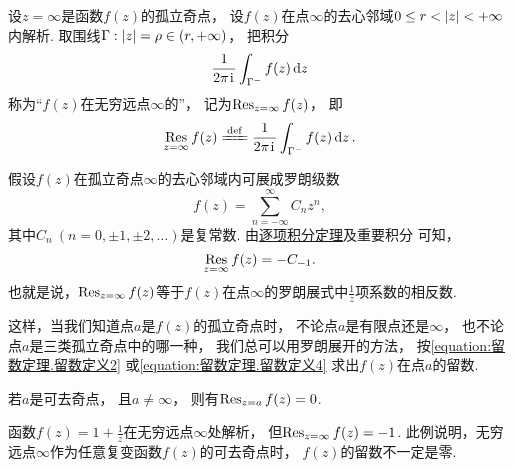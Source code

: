 \begin{definition}
设\(z=\infty\)是函数\(f(z)\)的孤立奇点，
设\(f(z)\)在点\(\infty\)的去心邻域\(0 \leq r < \abs{z} < +\infty\)内解析.
取围线\(\Gamma: \abs{z} = \rho\in(r,+\infty)\)，
把积分\[
	\frac{1}{2\pi\kern1pt\mathrm{i}\kern1pt} \int_{\Gamma^-} f(z) \dd{z}
\]称为“\(f(z)\)在无穷远点\(\infty\)的”，
记为\(\operatorname*{Res}_{z=\infty} f(z)\)，
即\begin{equation}\label{equation:留数定理.留数定义3}
	\Res_{z=\infty} f(z)
	\defeq
	\frac{1}{2\pi\iu} \int_{\Gamma^-} f(z) \dd{z}.
\end{equation}
\end{definition}

假设\(f(z)\)在孤立奇点\(\infty\)的去心邻域内可展成罗朗级数\[
	f(z) = \sum_{n=-\infty}^\infty C_n z^n,
\]
其中\(C_n\ (n=0,\pm1,\pm2,\dotsc)\)是复常数.
由\hyperref[theorem:解析函数的级数表示.一致收敛级数的基本性质2]{逐项积分定理}及重要积分  可知，
\begin{equation}\label{equation:留数定理.留数定义4}
	\operatorname*{Res}_{z=\infty} f(z) = - C_{-1}.
\end{equation}
也就是说，\(\operatorname*{Res}_{z=\infty} f(z)\)等于\(f(z)\)在点\(\infty\)的罗朗展式中\(\frac{1}{z}\)项系数的相反数.

这样，当我们知道点\(a\)是\(f(z)\)的孤立奇点时，
不论点\(a\)是有限点还是\(\infty\)，
也不论点\(a\)是三类孤立奇点中的哪一种，
我们总可以用罗朗展开的方法，
按\cref{equation:留数定理.留数定义2}
或\cref{equation:留数定理.留数定义4}
求出\(f(z)\)在点\(a\)的留数.

\begin{property}
若\(a\)是可去奇点，
且\(a\neq\infty\)，
则有\(\operatorname*{Res}_{z=a} f(z) = 0\).
\end{property}

\begin{example}
函数\(f(z) = 1 + \frac{1}{z}\)在无穷远点\(\infty\)处解析，
但\(\operatorname*{Res}_{z=\infty} f(z) = -1\).
此例说明，无穷远点\(\infty\)作为任意复变函数\(f(z)\)的可去奇点时，
\(f(z)\)的留数不一定是零.
\end{example}

